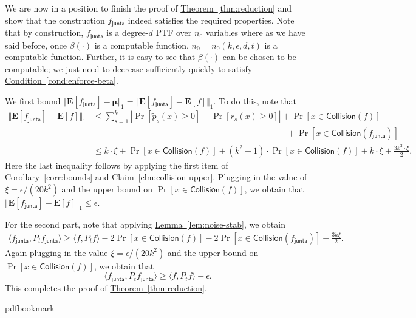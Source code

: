 \documentclass[11pt]{article}
\numberwithin{equation}{section}
\theoremstyle{definition}
\theoremstyle{plain}
\newcommand{\expref}[2]{\hyperref[#2]{#1~\ref{#2}}}
\newcommand{\fh}{{f_{\mathsf{junta}}}}
\begin{document}
We are now in a position to finish the proof of \expref{Theorem}{thm:reduction} and
show that the construction $\fh$ indeed satisfies the required properties. Note
that by construction, $\fh$ is a degree-$d$ PTF over $n_0$ variables where as
we have said before, once $\beta (\cdot)$ is a computable function, $n_0 = n_0(k,
\epsilon, d, t)$ is a computable function. Further, it is easy to see that
$\beta(\cdot)$ can be chosen to be computable; we just need to decrease sufficiently quickly
to satisfy
\expref{Condition}{cond:enforce-beta}. 

We first bound $\Vert \mathbf{E}[\fh] - \boldsymbol{\mu}\Vert_1 = \Vert \mathbf{E}[\fh] - \mathbf{E}[f] \Vert_1$. To do this, note that 
\begin{align*}
  \Vert \mathbf{E}[\fh] - \mathbf{E}[f] \Vert_1 &\le \sum_{s=1}^k |\Pr[\tilde{p}_s(x) \ge 0] - \Pr[{r}_s(x) \ge 0] | + \Pr[x \in \mathsf{Collision}(f)]\\
  &\phantom{\le \sum_{s=1}^k |\Pr[\tilde{p}_s(x) \ge 0] - \Pr[{r}_s(x) \ge 0] }\:\:\:\: + \Pr[x \in \mathsf{Collision}(\fh)] \\ &\le k \cdot \xi + \Pr[ x \in \mathsf{Collision}(f)] + (k^2 +1) \cdot \Pr[ x \in \mathsf{Collision}(f)] + k \cdot \xi + \frac{3 k^2 \cdot \xi}{2}. 
\end{align*}
Here the last inequality follows by applying the first item of \expref{Corollary}{corr:bounds} and \expref{Claim}{clm:collision-upper}. Plugging in the value of $\xi = {\epsilon}/{(20k^2)}$ and the upper bound on $\Pr[x \in \mathsf{Collision}(f)]$, we obtain that $\Vert \mathbf{E}[\fh] - \mathbf{E}[f] \Vert_1 \le \epsilon$. 

For the second part, note that applying \expref{Lemma}{lem:noise-stab}, we obtain
\begin{eqnarray*}
\langle \fh, P_t \fh \rangle \ge \langle f, P_t f \rangle - 2\Pr[x \in \mathsf{Collision}(f)] -2 \Pr[x \in \mathsf{Collision}(\fh)] - \frac{3k\xi}{2}. 
\end{eqnarray*}
Again plugging in the value $\xi = {\epsilon}/{(20k^2)}$ and the upper bound on $\Pr[x \in \mathsf{Collision}(f)]$, we obtain that 
$$
\langle \fh, P_t \fh \rangle \ge \langle f, P_t f \rangle - \epsilon.
$$
This completes the proof of \expref{Theorem}{thm:reduction}.


\nocite{DMN17-conf}   %
\nocite{Kalai:02}     %

\providecommand{\bibhead}[1]{}
\expandafter\ifx\csname pdfbookmark\endcsname\relax%
  \providecommand{\tocrefpdfbookmark}{}
\else\providecommand{\tocrefpdfbookmark}{%
   \hypertarget{tocreferences}{}%
   \pdfbookmark[1]{References}{tocreferences}}%
\fi
\end{document}
